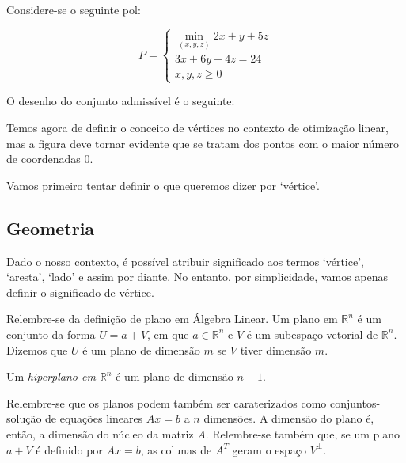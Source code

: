 \documentclass{article}
\newcommand{\R}{\mathbb{R}}
\theoremstyle{definition}
\begin{document}
	Considere-se o seguinte pol:
	
	\[
	P =
	\begin{cases}
	\min\limits_{(x,y,z)} 2x + y + 5z\\
	3x + 6y + 4z = 24\\
	x, y, z \geq 0
	\end{cases}
	\]
	
	O desenho do conjunto admissível é o seguinte:
	
	
	Temos agora de definir o conceito de vértices no contexto de otimização linear, mas a figura deve tornar evidente que se tratam dos pontos com o maior número de coordenadas 0.
	
	Vamos primeiro tentar definir o que queremos dizer por `vértice'.
	
	\subsection{Geometria}
	
	Dado o nosso contexto, é possível atribuir significado aos termos `vértice', `aresta', `lado' e assim por diante. No entanto, por simplicidade, vamos apenas definir o significado de vértice.
	
	Relembre-se da definição de plano em Álgebra Linear. Um plano em $\R^n$ é um conjunto da forma $U = a + V$, em que $a \in \R^n$ e $V$ é um subespaço vetorial de $\R^n$. Dizemos que $U$ é um plano de dimensão $m$ se $V$ tiver dimensão $m$.
	
	Um \emph{hiperplano em $\R^n$} é um plano de dimensão $n-1$.
	
	Relembre-se que os planos podem também ser caraterizados como conjuntos-solução de equações lineares $Ax = b$ a $n$ dimensões. A dimensão do plano é, então, a dimensão do núcleo da matriz $A$. Relembre-se também que, se um plano $a + V$ é definido por $Ax = b$, as colunas de $A^T$ geram o espaço $V^\perp$.
	
\end{document}
